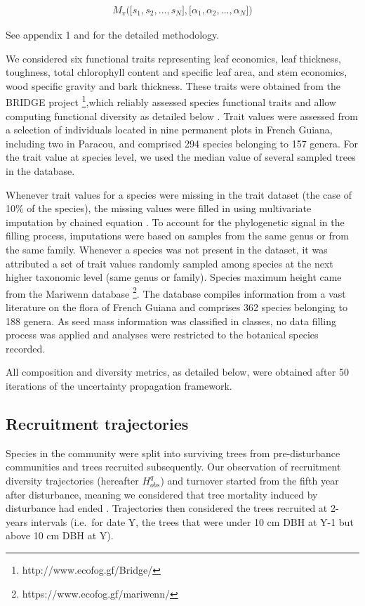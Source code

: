 \documentclass[fleqn,10pt]{ArtEcoFoG} %
\begin{document}
\begin{align}
M_v\Big(\big[s_1, s_2,..., s_N\big],\big[\alpha_1, \alpha_2,..., \alpha_N\big]\Big) \nonumber
\end{align}

See appendix 1 and \citet{Aubry-Kientz2013} for the detailed methodology.

We considered six functional traits representing leaf economics, leaf thickness, toughness, total chlorophyll content and specific leaf area, and stem economics, wood specific gravity and bark thickness. These traits were obtained from the BRIDGE project \footnote{http://www.ecofog.gf/Bridge/},which reliably assessed species functional traits and allow computing functional diversity as detailed below \citep{Paine2015}.
Trait values were assessed from a selection of individuals located in nine permanent plots in French Guiana, including two in Paracou, and comprised 294 species belonging to 157 genera. For the trait value at species level, we used the median value of several sampled trees in the database.

Whenever trait values for a species were missing in the trait dataset (the case of 10\% of the species), the missing values were filled in using multivariate imputation by chained equation \citep{Mice2011}.
To account for the phylogenetic signal in the filling process, imputations were based on samples from the same genus or from the same family. Whenever a species was not present in the dataset, it was attributed a set of trait values randomly sampled among species at the next higher taxonomic level (same genus or family).
Species maximum height came from the Mariwenn database \footnote{https://www.ecofog.gf/mariwenn/}.
The database compiles information from a vast literature on the flora of French Guiana \citep{Ollivier2007} and comprises 362 species belonging to 188 genera. As seed mass information was classified in classes, no data filling process was applied and analyses were restricted to the botanical species recorded.

All composition and diversity metrics, as detailed below, were obtained after 50 iterations of the uncertainty propagation framework.

\hypertarget{recruitment-trajectories}{%
\subsection{Recruitment trajectories}\label{recruitment-trajectories}}

Species in the community were split into surviving trees from pre-disturbance communities and trees recruited subsequently. Our observation of recruitment diversity trajectories (hereafter \(H^q_{obs}\)) and turnover started from the fifth year after disturbance, meaning we considered that tree mortality induced by disturbance had ended \citep{Piponiot2016}. Trajectories then considered the trees recruited at 2-years intervals (i.e.~for date Y, the trees that were under 10 cm DBH at Y-1 but above 10 cm DBH at Y).
\end{document}
